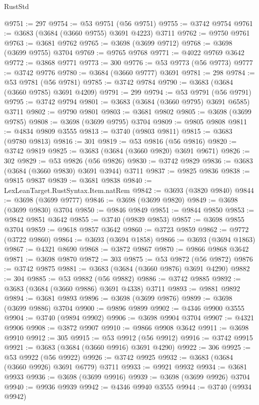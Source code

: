 \begin{lexlean}{RustStd}
\begin{coremodule}
@9751 := 297
@9754 := @53 @9751 (@56 @9751)
@9755 := @3742 @9754
@9761 := @3683 (@3684 (@3660 @9755) @3691 @4223) @3711
@9762 := @9750 @9761
@9763 := @3681 @9762
@9765 := @3698 (@3699 @9712)
@9768 := @3698 (@3699 @9755) @3704
@9769 := @9765 @9768
@9771 := @4022 @9769 @3642
@9772 := @3868 @9771
@9773 := 300
@9776 := @53 @9773 (@56 @9773)
@9777 := @3742 @9776
@9780 := @3684 (@3660 @9777) @3691
@9781 := 298
@9784 := @53 @9781 (@56 @9781)
@9785 := @3742 @9784
@9790 := @3683 (@3684 (@3660 @9785) @3691 @4209)
@9791 := 299
@9794 := @53 @9791 (@56 @9791)
@9795 := @3742 @9794
@9801 := @3683 (@3684 (@3660 @9795) @3691 @6585) @3711
@9802 := @9790 @9801
@9803 := @3681 @9802
@9805 := @3698 (@3699 @9785)
@9808 := @3698 (@3699 @9795) @3704
@9809 := @9805 @9808
@9811 := @4834 @9809 @3555
@9813 := @3740 (@9803 @9811)
@9815 := @3683 (@9780 @9813)
@9816 := 301
@9819 := @53 @9816 (@56 @9816)
@9820 := @3742 @9819
@9825 := @3683 (@3684 (@3660 @9820) @3691 @9671)
@9826 := 302
@9829 := @53 @9826 (@56 @9826)
@9830 := @3742 @9829
@9836 := @3683 (@3684 (@3660 @9830) @3691 @3944) @3711
@9837 := @9825 @9836
@9838 := @9815 @9837
@9839 := @3681 @9838
@9840 := LexLeanTarget.RustSyntax.Item.natRem
@9842 := @3693 (@3820 @9840)
@9844 := @3698 (@3699 @9777)
@9846 := @3698 (@3699 @9820)
@9849 := @3698 (@3699 @9830) @3704
@9850 := @9846 @9849
@9851 := @9844 @9850
@9853 := @9842 @9851 @3642
@9855 := @3740 (@9839 @9853)
@9857 := @3698 @9855 @3704
@9859 := @9618 @9857 @3642
@9860 := @3723 @9859
@9862 := @9772 (@3722 @9860)
@9864 := @3693 (@3694 @1858)
@9866 := @3693 (@3694 @1863)
@9867 := @4321 @8690
@9868 := @3872 @9867
@9870 := @9866 @9868 @3642
@9871 := @3698 @9870
@9872 := 303
@9875 := @53 @9872 (@56 @9872)
@9876 := @3742 @9875
@9881 := @3683 (@3684 (@3660 @9876) @3691 @4290)
@9882 := 304
@9885 := @53 @9882 (@56 @9882)
@9886 := @3742 @9885
@9892 := @3683 (@3684 (@3660 @9886) @3691 @4338) @3711
@9893 := @9881 @9892
@9894 := @3681 @9893
@9896 := @3698 (@3699 @9876)
@9899 := @3698 (@3699 @9886) @3704
@9900 := @9896 @9899
@9902 := @4346 @9900 @3555
@9904 := @3740 (@9894 @9902)
@9906 := @3698 @9904 @3704
@9907 := @4321 @9906
@9908 := @3872 @9907
@9910 := @9866 @9908 @3642
@9911 := @3698 @9910
@9912 := 305
@9915 := @53 @9912 (@56 @9912)
@9916 := @3742 @9915
@9921 := @3683 (@3684 (@3660 @9916) @3691 @4290)
@9922 := 306
@9925 := @53 @9922 (@56 @9922)
@9926 := @3742 @9925
@9932 := @3683 (@3684 (@3660 @9926) @3691 @6779) @3711
@9933 := @9921 @9932
@9934 := @3681 @9933
@9936 := @3698 (@3699 @9916)
@9939 := @3698 (@3699 @9926) @3704
@9940 := @9936 @9939
@9942 := @4346 @9940 @3555
@9944 := @3740 (@9934 @9942)

\end{coremodule}
\end{lexlean}
